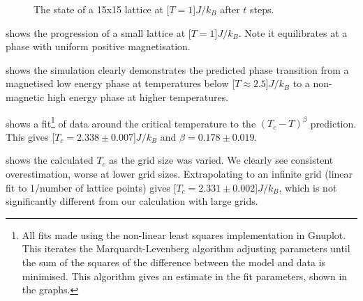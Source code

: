\documentclass[12pt,a4paper,english]{article}
\begin{document}
\begin{figure}
\caption{The state of a 15x15 lattice at \unit[$T=1$]{$J/k_B$} after $t$ steps.}\label{fig:progress}
\end{figure}

 shows the progression of a small lattice at \unit[$T=1$]{$J/k_B$}. Note it equilibrates at a phase with uniform positive magnetisation.

 shows the simulation clearly demonstrates the predicted phase transition from a magnetised low energy phase at temperatures below \unit[$T\approx2.5$]{$J/k_B$} to a non-magnetic high energy phase at higher temperatures.

 shows a fit\footnote{All fits made using the non-linear least squares implementation in Gnuplot.  This iterates the Marquardt-Levenberg algorithm adjusting parameters until the sum of the squares of the difference between the model and data is minimised. This algorithm gives an estimate in the fit parameters, shown in the graphs.} of data around the critical temperature to the $\left( T_c - T\right)^\beta$ prediction.  This gives \unit[$T_c=2.338\pm0.007$]{$J/k_B$} and $\beta=0.178\pm0.019$.

 shows the calculated $T_c$ as the grid size  was varied. We clearly see consistent overestimation, worse at lower grid sizes. Extrapolating to an infinite grid (linear fit to 1/number of lattice points) gives \unit[$T_c=2.331\pm0.002$]{$J/k_B$}, which is not significantly different from our calculation with large grids.
\end{document}
